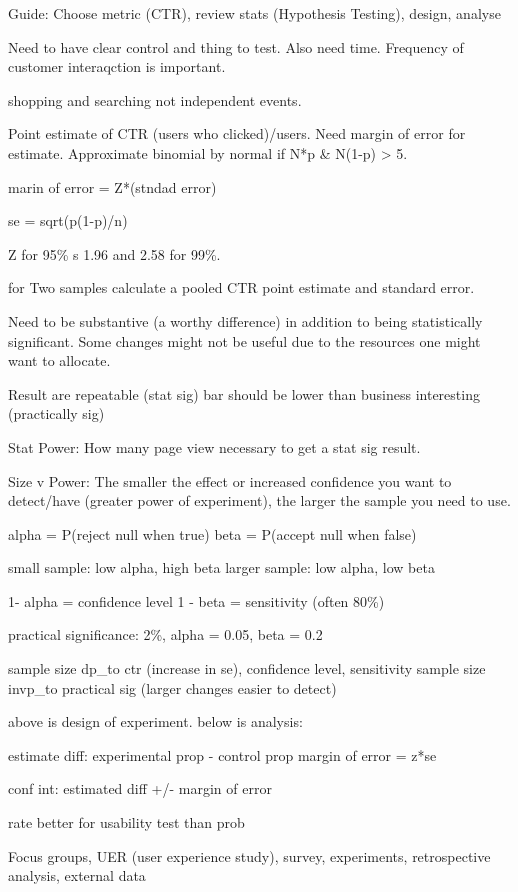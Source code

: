 \documentclass[]{book}
\begin{document}
Guide: Choose metric (CTR), review stats (Hypothesis Testing), design, analyse

Need to have clear control and thing to test. Also need time. Frequency of customer interaqction is important.

shopping and searching not independent events.

Point estimate of CTR (users who clicked)/users. Need margin of error for estimate. Approximate binomial by normal if N*p \& N(1-p) \textgreater{} 5.

marin of error = Z*(stndad error)

se = sqrt(p(1-p)/n)

Z for 95\% s 1.96 and 2.58 for 99\%.

for Two samples calculate a pooled CTR point estimate and standard error.

Need to be substantive (a worthy difference) in addition to being statistically significant. Some changes might not be useful due to the resources one might want to allocate.

Result are repeatable (stat sig) bar should be lower than business interesting (practically sig)

Stat Power: How many page view necessary to get a stat sig result.

Size v Power: The smaller the effect or increased confidence you want to detect/have (greater power of experiment), the larger the sample you need to use.

alpha = P(reject null when true)
beta = P(accept null when false)

small sample: low alpha, high beta
larger sample: low alpha, low beta

1- alpha = confidence level
1 - beta = sensitivity (often 80\%)

practical significance: 2\%, alpha = 0.05, beta = 0.2

sample size dp\_to ctr (increase in se), confidence level, sensitivity
sample size invp\_to practical sig (larger changes easier to detect)

above is design of experiment. below is analysis:

estimate diff: experimental prop - control prop
margin of error = z*se

conf int: estimated diff +/- margin of error

rate better for usability test than prob

Focus groups, UER (user experience study), survey, experiments, retrospective analysis, external data
\end{document}
